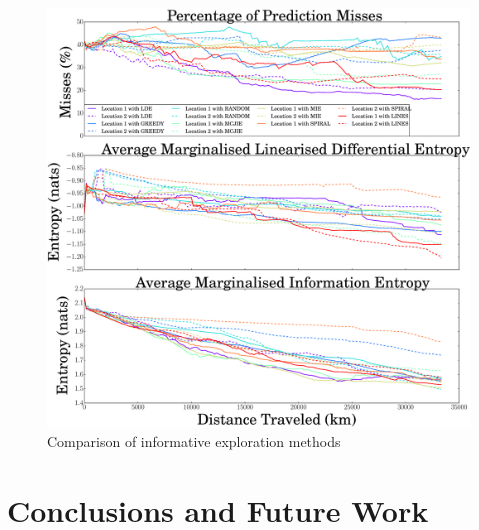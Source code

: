 \documentclass{article}
\begin{document}
		\begin{figure}[!htbp]
		\centering
			\includegraphics[width = \linewidth]{Figures/compare_methods.eps}
		\caption{Comparison of informative exploration methods}
		\label{Figure:Results:CompareMethods}
		\end{figure}
		
%	
%		

\section{Conclusions and Future Work}
\label{Section:Conclusion}
\end{document}
